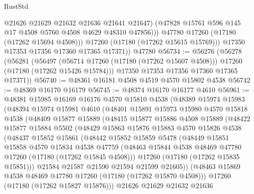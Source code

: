 \begin{lexlean}{RustStd}
\begin{coremodule}
{\begin{coremodule}
{{{{{{{{{{{{{{{{{{{{{{{{{{{{{{{{{{{{{{{{{{{{{{{{{{{{{{{                  @21626
                  @21629
                  @21632
                  @21636
                  @21641
                  @21647)
                (@47828 @15761 @596 @145 @17 @4508 @5760 @4508 @4629 @48310 @47856)))
            @47780
            @17260
            (@17180 (@17262 @15694 @4508)))
          @17260
          (@17180 (@17262 @15615 @15769)))
        @17350
        @17353
        @17356
        @17360
        @17365
        @17371))
    @47780
@56734 := @56276
    (@56278
      (@56281
        (@56497
          (@56714 @17260 (@17180 (@17262 @15607 @4508)))
          @17260
          (@17180 (@17262 @15426 @15784)))
        @17350
        @17353
        @17356
        @17360
        @17365
        @17371))
@56740 := @48361 @16181 @4508 @4519 @4570 @15802 @4538
@56742 := @48369 @16170 @16179
@56745 := @48374 @16170 @16177 @4610
@56961 := @48381
    @15985
    @16169
    @16176
    @4570
    @15810
    @4538
    (@48389
      @15974
      @15983
      (@48394
        @15974
        @15981
        @4610
        (@48401
          @15891
          @15973
          @15980
          @4570
          @15818
          @4538
          (@48409
            @15877
            @15889
            (@48415
              @15877
              @15886
              @4508
              @15889
              (@48422
                @15877
                @15884
                @5502
                (@48429
                  @15863
                  @15876
                  @15883
                  @4570
                  @15826
                  @4538
                  (@48437
                    @15852
                    @15861
                    (@48442
                      @15852
                      @15859
                      @5478
                      (@48449
                        @15851
                        @15858
                        @4570
                        @15834
                        @4538
                        @47759
                        (@48463 @15844 @4538 @48469 @47780 @17260 (@17180 (@17262 @15845 @4508)))
                        @17260
                        (@17180 (@17262 @15835 @15851)))
                      @21584
                      @21587
                      @21590
                      @21594
                      @21599
                      @21605))
                  (@48463 @15869 @4538 @48469 @47780 @17260 (@17180 (@17262 @15870 @4508)))
                  @17260
                  (@17180 (@17262 @15827 @15876)))
                @21626
                @21629
                @21632
                @21636
}}}}}}}}}}}}}}}}}}}}}}}}}}}}}}}}}}}}}}}}}}}}}}}}}}}}}}}
\end{coremodule}}
\end{coremodule}
\end{lexlean}
